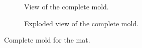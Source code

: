 \begin{figure}[H]
    \centering
    \begin{subfigure}[b]{0.475\textwidth}
        \centering
        \caption{View of the complete mold.}
        \label{fig: mat_v1}
    \end{subfigure}
    \hfill
    \begin{subfigure}[b]{0.475\textwidth}
        \centering
        \caption{Exploded view of the complete mold.}
        \label{fig: mold_v1}
    \end{subfigure}
    \caption{Complete mold for the mat.}
\end{figure}